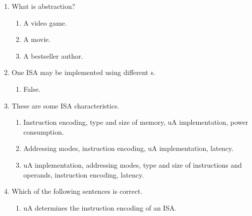 \documentclass[number=1]{exam}
\begin{document}
\begin{enumerate}
\item {} What is abstraction?
\begin{enumerate}[label=\alph*)]
\item A video game.
\item A movie.
\item A bestseller author.
\end{enumerate}

\item {} One \acs{ISA} may be implemented using different \uA s.
\begin{enumerate}[label=\alph*)]
\item False.
\end{enumerate}

\item {} These are some \acs{ISA} characteristics.
\begin{enumerate}[label=\alph*)]
\item Instruction encoding, type and size of memory, \acs{uA} implementation, power consumption.
\item Addressing modes, instruction encoding, \acs{uA} implementation, latency.
\item \acs{uA} implementation, addressing modes, type and size of instructions and operands, instruction encoding,  latency.
\end{enumerate}

\item {} Which of the following sentences is correct.
\begin{enumerate}[label=\alph*)]
\item \acs{uA} determines the instruction encoding of an \acs{ISA}.
\end{enumerate}


\end{enumerate}
\end{document}
